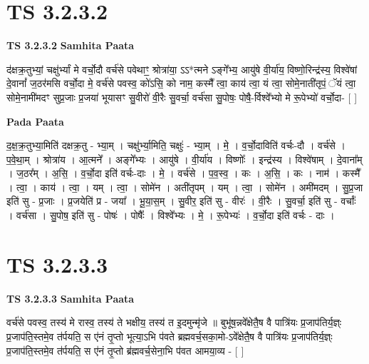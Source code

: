 \documentclass[17pt]{extarticle}
\begin{document}

\section{ TS 3.2.3.2 }

\textbf{TS 3.2.3.2 } \newline
\textbf{Samhita Paata} \newline

द॑क्षक्र॒तुभ्यां॒ चक्षु॑र्भ्यां मे वर्चो॒दौ वर्च॑से पवेथाꣳ॒॒ श्रोत्रा॑या॒ ऽऽ*त्मने ऽङ्गे᳚भ्य॒ आयु॑षे वी॒र्या॑य॒ विष्णो॒रिन्द्र॑स्य॒ विश्वे॑षां दे॒वानां᳚ ज॒ठर॑मसि वर्चो॒दा मे॒ वर्च॑से पवस्व॒ को॑ऽसि॒ को नाम॒ कस्मै᳚ त्वा॒ काय॑ त्वा॒ यं त्वा॒ सोमे॒नाती॑तृपं॒ ॅयं त्वा॒ सोमे॒नामी॑मदꣳ सुप्र॒जाः प्र॒जया॑ भूयासꣳ सु॒वीरो॑ वी॒रैः सु॒वर्चा॒ वर्च॑सा सु॒पोषः॒ पोषै॒-र्विश्वे᳚भ्यो मे रू॒पेभ्यो॑ वर्चो॒दा- [  ] \newline

\textbf{Pada Paata} \newline

द॒क्ष॒क्र॒तुभ्या॒मिति॑ दक्षक्र॒तु - भ्या॒म् । चक्षु॑र्भ्या॒मिति॒ चक्षुः॑ - भ्या॒म् । मे॒ । व॒र्चो॒दाविति॑ वर्चः-दौ । वर्च॑से । प॒वे॒था॒म् । श्रोत्रा॑य । आ॒त्मने᳚ । अङ्गे᳚भ्यः । आयु॑षे । वी॒र्या॑य । विष्णोः᳚ । इन्द्र॑स्य । विश्वे॑षाम् । दे॒वाना᳚म् । ज॒ठर᳚म् । अ॒सि॒ । व॒र्चो॒दा इति॑ वर्चः-दाः । मे॒ । वर्च॑से । प॒व॒स्व॒ । कः । अ॒सि॒ । कः । नाम॑ । कस्मै᳚ । त्वा॒ । काय॑ । त्वा॒ । यम् । त्वा॒ । सोमे॑न । अती॑तृपम् । यम् । त्वा॒ । सोमे॑न । अमी॑मदम् । सु॒प्र॒जा इति॑ सु - प्र॒जाः । प्र॒जयेति॑ प्र - जया᳚ । भू॒या॒स॒म् । सु॒वीर॒ इति॑ सु - वीरः॑ । वी॒रैः । सु॒वर्चा॒ इति॑ सु - वर्चाः᳚ । वर्च॑सा । सु॒पोष॒ इति॑ सु - पोषः॑ । पोषैः᳚ । विश्वे᳚भ्यः । मे॒ । रू॒पेभ्यः॑ । व॒र्चो॒दा इति॑ वर्चः - दाः ।  \newline





\section{ TS 3.2.3.3 }

\textbf{TS 3.2.3.3 } \newline
\textbf{Samhita Paata} \newline

वर्च॑से पवस्व॒ तस्य॑ मे रास्व॒ तस्य॑ ते भक्षीय॒ तस्य॑ त इ॒दमुन्मृ॑जे ॥ बुभू॑ष॒न्नवे᳚क्षेतै॒ष वै पात्रि॑यः प्र॒जाप॑तिर्य॒ज्ञ्ः प्र॒जाप॑ति॒स्तमे॒व त॑र्पयति॒ स ए॑नं तृ॒प्तो भूत्या॒ऽभि प॑वते ब्रह्मवर्च॒सका॒मो-ऽवे᳚क्षेतै॒ष वै पात्रि॑यः प्र॒जाप॑तिर्य॒ज्ञ्ः प्र॒जाप॑ति॒स्तमे॒व त॑र्पयति॒ स ए॑नं तृ॒प्तो ब्र॑ह्मवर्च॒सेना॒भि प॑वत आमया॒व्य - [  ] \newline
\end{document}
